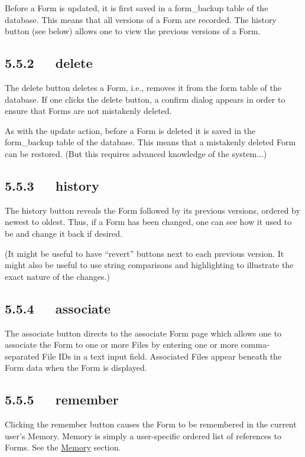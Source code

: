 \documentclass[letterpaper,10pt,english]{sphinxmanual}
\begin{document}
Before a Form is updated, it is first saved in a form\_backup table of the
database.  This means that all versions of a Form are recorded.  The history
button (see below) allows one to view the previous versions of a Form.


\subsection{5.5.2   delete}
\label{user_guide:delete}
The delete button deletes a Form, i.e., removes it from the form table of the
database.  If one clicks the delete button, a confirm dialog appears in order to
ensure that Forms are not mistakenly deleted.

As with the update action, before a Form is deleted it is saved in the
form\_backup table of the database.  This means that a mistakenly deleted Form
can be restored.  (But this requires advanced knowledge of the system...)


\subsection{5.5.3   history}
\label{user_guide:history}
The history button reveals the Form followed by its previous versions, ordered
by newest to oldest.  Thus, if a Form has been changed, one can see how it used
to be and change it back if desired.

(It might be useful to have ``revert'' buttons next to each previous version.  It
might also be useful to use string comparisons and highlighting to illustrate
the exact nature of the changes.)


\subsection{5.5.4   associate}
\label{user_guide:associate}
The associate button directs to the associate Form page which allows one to
associate the Form to one or more Files by entering one or more comma-separated
File IDs in a text input field.  Associated Files appear beneath the Form
data when the Form is displayed.


\subsection{5.5.5   remember}
\label{user_guide:remember}
Clicking the remember button causes the Form to be remembered in the current
user's Memory.  Memory is simply a user-specific ordered list of references to
Forms.  See the {\hyperref[user_guide:memory]{Memory}} section.
\end{document}
